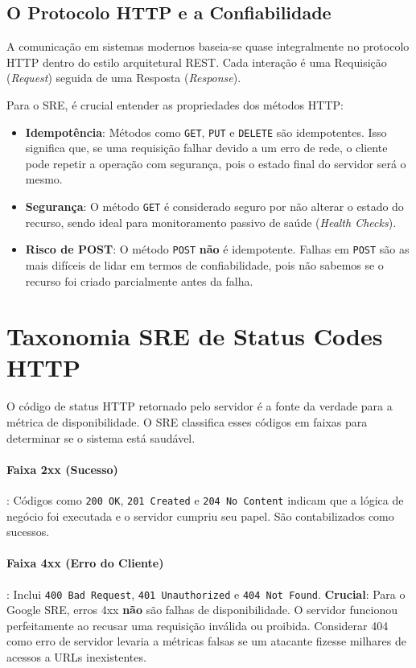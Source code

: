 \documentclass[12pt,a4paper,twoside]{report}
\begin{document}
\subsection{O Protocolo HTTP e a Confiabilidade}

A comunicação em sistemas modernos baseia-se quase integralmente no protocolo HTTP dentro do estilo arquitetural REST. Cada interação é uma Requisição (\textit{Request}) seguida de uma Resposta (\textit{Response}).

Para o SRE, é crucial entender as propriedades dos métodos HTTP:
\begin{itemize}
    \item \textbf{Idempotência}: Métodos como \texttt{GET}, \texttt{PUT} e \texttt{DELETE} são idempotentes. Isso significa que, se uma requisição falhar devido a um erro de rede, o cliente pode repetir a operação com segurança, pois o estado final do servidor será o mesmo.
    \item \textbf{Segurança}: O método \texttt{GET} é considerado seguro por não alterar o estado do recurso, sendo ideal para monitoramento passivo de saúde (\textit{Health Checks}).
    \item \textbf{Risco de POST}: O método \texttt{POST} \textbf{não} é idempotente. Falhas em \texttt{POST} são as mais difíceis de lidar em termos de confiabilidade, pois não sabemos se o recurso foi criado parcialmente antes da falha.
\end{itemize}

\section{Taxonomia SRE de Status Codes HTTP}

O código de status HTTP retornado pelo servidor é a fonte da verdade para a métrica de disponibilidade. O SRE classifica esses códigos em faixas para determinar se o sistema está saudável.

\paragraph{Faixa 2xx (Sucesso)}: Códigos como \texttt{200 OK}, \texttt{201 Created} e \texttt{204 No Content} indicam que a lógica de negócio foi executada e o servidor cumpriu seu papel. São contabilizados como sucessos.

\paragraph{Faixa 4xx (Erro do Cliente)}: Inclui \texttt{400 Bad Request}, \texttt{401 Unauthorized} e \texttt{404 Not Found}. \textbf{Crucial}: Para o Google SRE, erros 4xx \textbf{não} são falhas de disponibilidade. O servidor funcionou perfeitamente ao recusar uma requisição inválida ou proibida. Considerar 404 como erro de servidor levaria a métricas falsas se um atacante fizesse milhares de acessos a URLs inexistentes.
\end{document}
